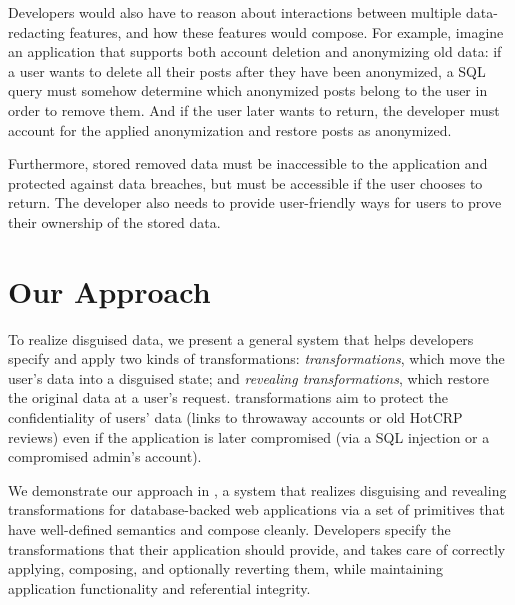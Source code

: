 %
Developers would also have to reason about interactions between multiple
data-redacting features, and how these features would compose.
%
For example, imagine an application that supports both account deletion and
anonymizing old data: if a user wants to delete all their posts after they have
been anonymized, a SQL query must somehow determine which anonymized posts
belong to the user in order to remove them.
%
And if the user later wants to return, the developer must account for the
applied anonymization and restore posts as anonymized.
%

%
Furthermore, stored removed data must be inaccessible to the application and
protected against data breaches, but must be accessible if the user chooses to
return. The developer also needs to provide user-friendly ways for users to
prove their ownership of the stored data.
%

%
%


\section{Our Approach}
%
To realize disguised data, we present a general system that helps developers
specify and apply two kinds of transformations: \emph{\xxing transformations},
which move the user's data into a disguised state; and \emph{revealing
transformations}, which restore the original data at a user’s request.
%
\Xxing transformations aim to protect the confidentiality of users' \xxed data
(\eg links to throwaway accounts or old HotCRP reviews) even if the application
is later compromised (\eg via a SQL injection or a compromised admin's account).
%

%
We demonstrate our approach in \sys, a system that realizes disguising and
revealing transformations for database-backed web applications via a set of
primitives that have well-defined semantics and compose cleanly.
%
Developers specify the transformations that their application should provide,
and \sys takes care of correctly applying, composing, and optionally reverting
them, while maintaining application functionality and referential integrity.
%

